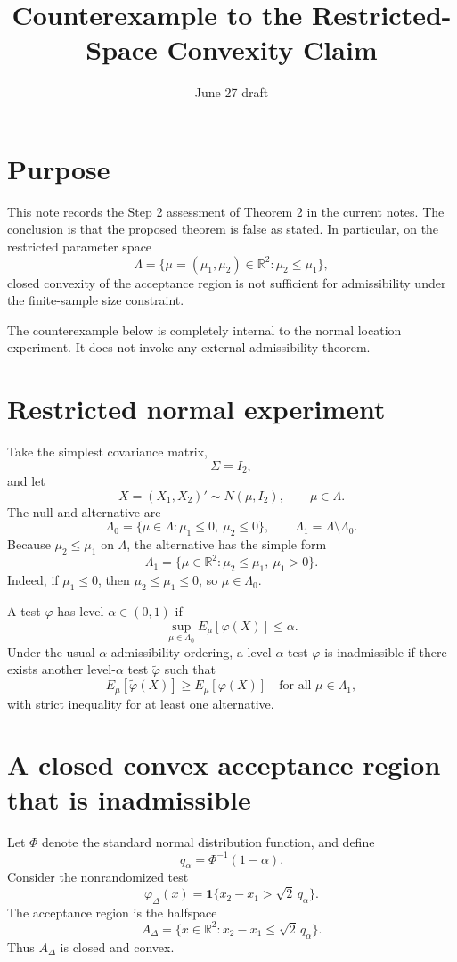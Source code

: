 \documentclass[11pt]{article}
\title{Counterexample to the Restricted-Space Convexity Claim}
\author{}
\date{June 27 draft}
\begin{document}
\maketitle

\section{Purpose}

This note records the Step 2 assessment of Theorem 2 in the current notes.  The conclusion is that the proposed theorem is false as stated.  In particular, on the restricted parameter space
\[
  \Lambda = \{\mu=(\mu_1,\mu_2)\in\mathbb{R}^2 : \mu_2\le \mu_1\},
\]
closed convexity of the acceptance region is not sufficient for admissibility under the finite-sample size constraint.

The counterexample below is completely internal to the normal location experiment.  It does not invoke any external admissibility theorem.

\section{Restricted normal experiment}

Take the simplest covariance matrix,
\[
  \Sigma = I_2,
\]
and let
\[
  X=(X_1,X_2)'\sim N(\mu,I_2),
  \qquad \mu\in \Lambda.
\]
The null and alternative are
\[
  \Lambda_0 = \{\mu\in\Lambda: \mu_1\le 0,\ \mu_2\le 0\},
  \qquad
  \Lambda_1 = \Lambda\setminus\Lambda_0.
\]
Because \(\mu_2\le \mu_1\) on \(\Lambda\), the alternative has the simple form
\[
  \Lambda_1 = \{\mu\in\mathbb{R}^2: \mu_2\le \mu_1,\ \mu_1>0\}.
\]
Indeed, if \(\mu_1\le 0\), then \(\mu_2\le \mu_1\le 0\), so \(\mu\in\Lambda_0\).

A test \(\varphi\) has level \(\alpha\in(0,1)\) if
\[
  \sup_{\mu\in\Lambda_0} E_\mu[\varphi(X)]\le \alpha.
\]
Under the usual \(\alpha\)-admissibility ordering, a level-\(\alpha\) test \(\varphi\) is inadmissible if there exists another level-\(\alpha\) test \(\tilde\varphi\) such that
\[
  E_\mu[\tilde\varphi(X)]\ge E_\mu[\varphi(X)]
  \quad\text{for all }\mu\in\Lambda_1,
\]
with strict inequality for at least one alternative.

\section{A closed convex acceptance region that is inadmissible}

Let \(\Phi\) denote the standard normal distribution function, and define
\[
  q_\alpha = \Phi^{-1}(1-\alpha).
\]
Consider the nonrandomized test
\[
  \varphi_\Delta(x)
  = \mathbf{1}\{x_2-x_1>\sqrt{2}\,q_\alpha\}.
\]
The acceptance region is the halfspace
\[
  A_\Delta
  = \{x\in\mathbb{R}^2:x_2-x_1\le \sqrt{2}\,q_\alpha\}.
\]
Thus \(A_\Delta\) is closed and convex.
\end{document}
